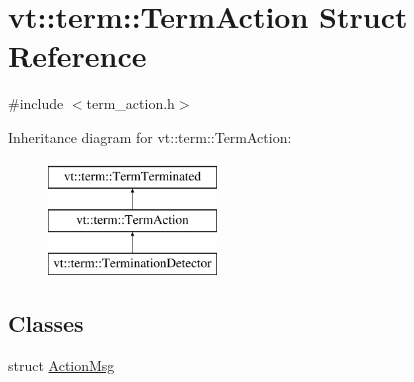 \hypertarget{structvt_1_1term_1_1_term_action}{}\section{vt\+:\+:term\+:\+:Term\+Action Struct Reference}
\label{structvt_1_1term_1_1_term_action}


{\ttfamily \#include $<$term\+\_\+action.\+h$>$}

Inheritance diagram for vt\+:\+:term\+:\+:Term\+Action\+:\begin{figure}[H]
\begin{center}
\leavevmode
\includegraphics[height=3.000000cm]{structvt_1_1term_1_1_term_action}
\end{center}
\end{figure}
\subsection*{Classes}
\begin{DoxyCompactItemize}
\item 
struct \hyperlink{structvt_1_1term_1_1_term_action_1_1_action_msg}{Action\+Msg}
\end{DoxyCompactItemize}
